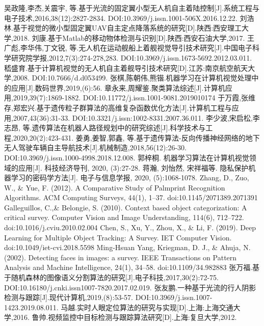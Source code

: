 \documentclass[UTF8,a4paper,10pt,nocolorlinks]{ctexart}
\begin{document}
\renewcommand{\refname}{参考文献}   %
\begin{thebibliography}{99}
\addtolength{\itemsep}{-2ex} %

吴政隆,李杰,关震宇, 等.基于光流的固定翼小型无人机自主着陆控制[J].系统工程与电子技术,2016,38(12):2827-2834. DOI:10.3969/j.issn.1001-506X.2016.12.22.
刘浩林.基于视觉的微小型固定翼UAV自主定点降落系统的研究[D].陕西:西安理工大学,2018.
刘康.基于Matlab的移动物体检测与识别[D].陕西:西安石油大学,2017.
王广彪,李华伟,丁文锐, 等.无人机在运动舰船上着舰视觉导引技术研究[J].中国电子科学研究院学报,2012,7(3):274-278,283. DOI:10.3969/j.issn.1673-5692.2012.03.011.
嵇盛育.基于计算机视觉的无人机自主着舰导引技术研究[D].江苏:南京航空航天大学,2008. DOI:10.7666/d.d053499.
张棋,陈朝伟,熊锴.机器学习在计算机视觉处理中的应用[J].数码世界,2019,(6):56.
章永来,周耀鉴.聚类算法综述[J].计算机应用,2019,39(7):1869-1882. DOI:10.11772/j.issn.1001-9081.2019010174
于万霞,张维存,郑宏兴.基于遗传粒子群算法的高维复杂函数优化方法[J].计算机工程与应用,2007,43(36):31-33. DOI:10.3321/j.issn:1002-8331.2007.36.011.
李少波,宋启松,李志昂, 等.遗传算法在机器人路径规划中的研究综述[J].科学技术与工程,2020,20(2):423-431.
姜勇,姜智,郭鑫, 等.基于遗传算法-反向传播神经网络的地下无人驾驶车辆自主导航技术[J].机械制造,2018,56(12):26-30. DOI:10.3969/j.issn.1000-4998.2018.12.008.
郭梓桐. 机器学习算法在计算机视觉领域的应用[J]. 科技经济导刊, 2020, (3):27-28.
蒋瀚, 刘怡然, 宋祥福等. 隐私保护机器学习的密码学方法[J]. 电子与信息学报, 2020, (5):1068-1078.
Zhang, D., Zuo, W., \& Yue, F. (2012). A Comparative Study of Palmprint Recognition Algorithms. ACM Computing Surveys, 44(1), 1–37. doi:10.1145/2071389.2071391 
Galleguillos, C.,\& Belongie, S. (2010). Context based object categorization: A critical survey. Computer Vision and Image Understanding, 114(6), 712–722. doi:10.1016/j.cviu.2010.02.004 
Chen, S., Xu, Y., Zhou, X., \& Li, F. (2019). Deep Learning for Multiple Object Tracking: A Survey. IET Computer Vision. doi:10.1049/iet-cvi.2018.5598 
Ming-Hsuan Yang, Kriegman, D. J., \& Ahuja, N. (2002). Detecting faces in images: a survey. IEEE Transactions on Pattern Analysis and Machine Intelligence, 24(1), 34–58. doi:10.1109/34.982883 
张万福.基于随机森林的图像语义分割算法的研究[J].电子科技,2017,30(2):72-75. DOI:10.16180/j.cnki.issn1007-7820.2017.02.019.
张友鹏.一种基于光流的行人阴影检测与跟踪[J].现代计算机,2019,(8):53-57. DOI:10.3969/j.issn.1007-1423.2019.08.011.
马越.实时人眼定位算法的研究与实现[D].上海:上海交通大学,2016.
鲁帅.视频监控中目标检测与跟踪算法研究[D].上海:复旦大学,2012.
\end{thebibliography}  
\end{document}
